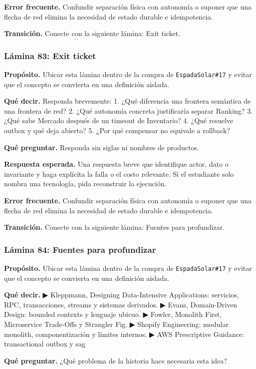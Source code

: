 \documentclass[variant=docente,cover=institutional,mode=screen]{ua-engineering-v6-article}
\begin{document}
\textbf{Error frecuente.} Confundir separación física con autonomía o suponer que una flecha de red elimina la necesidad de estado durable e idempotencia.

\textbf{Transición.} Conecte con la siguiente lámina: Exit ticket.

\subsubsection*{Lámina 83: Exit ticket}
\textbf{Propósito.} Ubicar esta lámina dentro de la compra de \texttt{EspadaSolar\#17} y evitar que el concepto se convierta en una definición aislada.

\textbf{Qué decir.} Responda brevemente: 1. ¿Qué diferencia una frontera semántica de una frontera de red? 2. ¿Qué autonomía concreta justificaría separar Ranking? 3. ¿Qué sabe Mercado después de un timeout de Inventario? 4. ¿Qué resuelve outbox y qué deja abierto? 5. ¿Por qué compensar no equivale a rollback?

\textbf{Qué preguntar.} Responda sin siglas ni nombres de productos.

\textbf{Respuesta esperada.} Una respuesta breve que identifique actor, dato o invariante y haga explícita la falla o el costo relevante. Si el estudiante solo nombra una tecnología, pida reconstruir la ejecución.

\textbf{Error frecuente.} Confundir separación física con autonomía o suponer que una flecha de red elimina la necesidad de estado durable e idempotencia.

\textbf{Transición.} Conecte con la siguiente lámina: Fuentes para profundizar.

\subsubsection*{Lámina 84: Fuentes para profundizar}
\textbf{Propósito.} Ubicar esta lámina dentro de la compra de \texttt{EspadaSolar\#17} y evitar que el concepto se convierta en una definición aislada.

\textbf{Qué decir.} ▶ Kleppmann, Designing Data-Intensive Applications: servicios, RPC, transacciones, streams y sistemas derivados. ▶ Evans, Domain-Driven Design: bounded contexts y lenguaje ubicuo. ▶ Fowler, Monolith First, Microservice Trade-Offs y Strangler Fig. ▶ Shopify Engineering: modular monolith, componentización y límites internos. ▶ AWS Prescriptive Guidance: transactional outbox y sag

\textbf{Qué preguntar.} ¿Qué problema de la historia hace necesaria esta idea?
\end{document}

